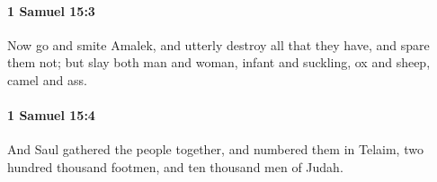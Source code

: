 		\paragraph{1 Samuel 15:3} %
			\label{1SAMUEL-15-3}

			Now go and smite Amalek, and utterly destroy all that they have, and spare them not; but slay both man and woman, infant and suckling, ox and sheep, camel and ass.


		\paragraph{1 Samuel 15:4} %
			\label{1SAMUEL-15-4}

			And Saul gathered the people together, and numbered them in Telaim, two hundred thousand footmen, and ten thousand men of Judah.


